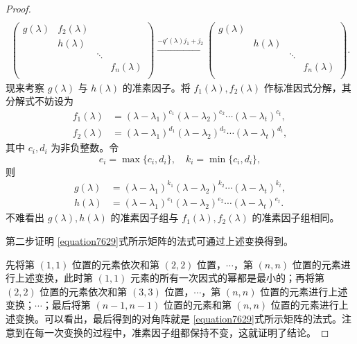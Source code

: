 \documentclass[../../main.tex]{subfiles}%
\begin{document}
\begin{proof}
\begin{gather*}
\\
\left( \begin{matrix}
g(\lambda )&		f_2\left( \lambda \right)&		&		\\
&		h(\lambda )&		&		\\
&		&		\ddots&		\\
&		&		&		f_n(\lambda )\\
\end{matrix} \right) \xrightarrow{-q\prime (\lambda )j_1+j_2}\left( \begin{matrix}
g(\lambda )&		&		&		\\
&		h(\lambda )&		&		\\
&		&		\ddots&		\\
&		&		&		f_n(\lambda )\\
\end{matrix} \right) .
\end{gather*}
现来考察 $g(\lambda)$ 与 $h(\lambda)$ 的准素因子。将 $f_1(\lambda), f_2(\lambda)$ 作标准因式分解，其分解式不妨设为
\begin{align*}
f_1(\lambda)&=(\lambda - \lambda_1)^{c_1}(\lambda - \lambda_2)^{c_2}\cdots(\lambda - \lambda_t)^{c_t},\\
f_2(\lambda)&=(\lambda - \lambda_1)^{d_1}(\lambda - \lambda_2)^{d_2}\cdots(\lambda - \lambda_t)^{d_t},
\end{align*}
其中 $c_i, d_i$ 为非负整数。令
\[
e_i = \max\{c_i, d_i\},\quad k_i = \min\{c_i, d_i\},
\]
则
\begin{align*}
g(\lambda)&=(\lambda - \lambda_1)^{k_1}(\lambda - \lambda_2)^{k_2}\cdots(\lambda - \lambda_t)^{k_t},\\
h(\lambda)&=(\lambda - \lambda_1)^{e_1}(\lambda - \lambda_2)^{e_2}\cdots(\lambda - \lambda_t)^{e_t}.
\end{align*}
不难看出 $g(\lambda), h(\lambda)$ 的准素因子组与 $f_1(\lambda), f_2(\lambda)$ 的准素因子组相同。 

第二步证明 \eqref{equation7629}式所示矩阵的法式可通过上述变换得到。

先将第 $(1,1)$ 位置的元素依次和第 $(2,2)$ 位置，$\cdots$，第 $(n,n)$ 位置的元素进行上述变换，此时第 $(1,1)$ 元素的所有一次因式的幂都是最小的；再将第 $(2,2)$ 位置的元素依次和第 $(3,3)$ 位置，$\cdots$，第 $(n,n)$ 位置的元素进行上述变换；$\cdots$；最后将第 $(n - 1,n - 1)$ 位置的元素和第 $(n,n)$ 位置的元素进行上述变换。可以看出，最后得到的对角阵就是 \eqref{equation7629}式所示矩阵的法式。注意到在每一次变换的过程中，准素因子组都保持不变，这就证明了结论。
\end{proof}
\end{document}
